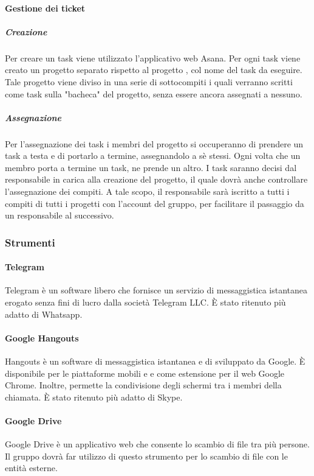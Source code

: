  \paragraph{Gestione dei ticket}
 \subparagraph{Creazione}
Per creare un task viene utilizzato l'applicativo web Asana. Per ogni task viene creato un progetto separato rispetto al progetto \PROGETTO{}, col nome del task da eseguire. Tale progetto viene diviso in una serie di sottocompiti i quali verranno scritti come task sulla "bacheca" del
progetto, senza essere ancora assegnati a nessuno.
 \subparagraph{Assegnazione}
 Per l'assegnazione dei task i membri del progetto si occuperanno
di prendere un task a testa e di portarlo a termine, assegnandolo a sè stessi. Ogni
volta che un membro porta a termine un task, ne prende un altro. I task
saranno decisi dal responsabile in carica alla creazione del progetto, il quale
dovrà anche controllare l'assegnazione dei compiti. A tale scopo,
il responsabile sarà iscritto a tutti i compiti di tutti i progetti con l'account del gruppo,
per facilitare il passaggio da un responsabile al successivo.
\subsubsection{Strumenti}
 \paragraph{Telegram}
 Telegram è un software libero che fornisce un servizio di messaggistica istantanea erogato senza fini di lucro dalla società Telegram LLC. È stato ritenuto più adatto di Whatsapp.
 \paragraph{Google Hangouts}
 Hangouts è un software di messaggistica istantanea e di    sviluppato da Google. È disponibile per le piattaforme mobili  e  e come estensione per il  web Google Chrome. Inoltre, permette la condivisione degli schermi tra i membri della chiamata. È stato ritenuto più adatto di Skype.
 \paragraph{Google Drive}
 Google Drive è un applicativo web che consente lo scambio di file tra più persone. Il gruppo \GRUPPO dovrà far utilizzo di questo strumento per lo scambio di file con le entità esterne.
